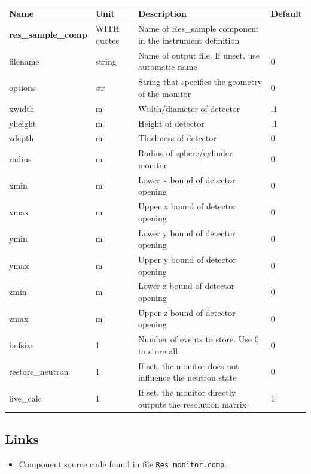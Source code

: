 \begin{longtable}{p{}p{}p{}p{}}
\toprule
\textbf{Name} & \textbf{Unit} & \textbf{Description} & \textbf{Default} \\
\midrule
\endhead
\textbf{res\_sample\_comp} & WITH quotes & Name of Res\_sample component in the instrument definition &  \\
filename & string & Name of output file. If unset, use automatic name & 0 \\
options & str & String that specifies the geometry of the monitor & 0 \\
xwidth & m & Width/diameter of detector & .1 \\
yheight & m & Height of detector & .1 \\
zdepth & m & Thichness of detector & 0 \\
radius & m & Radius of sphere/cylinder monitor & 0 \\
xmin & m & Lower x bound of detector opening & 0 \\
xmax & m & Upper x bound of detector opening & 0 \\
ymin & m & Lower y bound of detector opening & 0 \\
ymax & m & Upper y bound of detector opening & 0 \\
zmin & m & Lower z bound of detector opening & 0 \\
zmax & m & Upper z bound of detector opening & 0 \\
bufsize & 1 & Number of events to store. Use 0 to store all & 0 \\
restore\_neutron & 1 & If set, the monitor does not influence the neutron state & 0 \\
live\_calc & 1 & If set, the monitor directly outputs the resolution matrix & 1 \\
\bottomrule
\end{longtable}

\subsection*{Links}
\begin{itemize}
  \item Component source code found in file \texttt{Res\_monitor.comp}.
\end{itemize}
